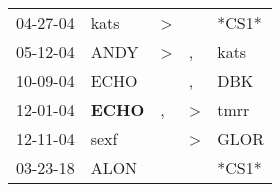 \begin{supertabular}{p{0.07\textwidth}p{0.06\textwidth}p{0.02\textwidth}p{0.02\textwidth}p{0.06\textwidth}}
 04-27-04\textsuperscript{} &           kats\textsuperscript{} &  \textgreater &               &                   *CS1* \\
 05-12-04\textsuperscript{} &           ANDY\textsuperscript{} &  \textgreater &             , &  kats\textsuperscript{} \\
 10-09-04\textsuperscript{} &           ECHO\textsuperscript{} &               &             , &   DBK\textsuperscript{} \\
 12-01-04\textsuperscript{} &  \textbf{ECHO\textsuperscript{}} &             , &  \textgreater &  tmrr\textsuperscript{} \\
 12-11-04\textsuperscript{} &           sexf\textsuperscript{} &               &  \textgreater &  GLOR\textsuperscript{} \\
 03-23-18\textsuperscript{} &           ALON\textsuperscript{} &               &               &                   *CS1* \\
\end{supertabular}
